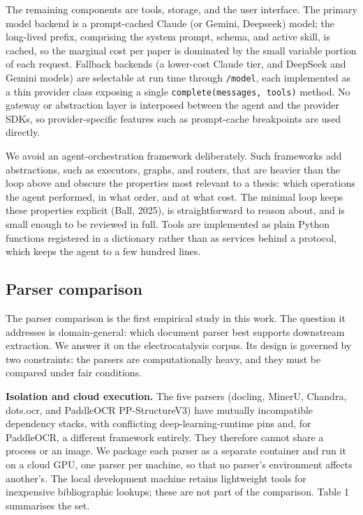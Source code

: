 \documentclass{template}
\begin{document}
The remaining components are tools, storage, and the user interface. The primary model backend is a prompt-cached Claude (or Gemini, Deepseek) model; the long-lived prefix, comprising the system prompt, schema, and active skill, is cached, so the marginal cost per paper is dominated by the small variable portion of each request. Fallback backends (a lower-cost Claude tier, and DeepSeek and Gemini models) are selectable at run time through \texttt{/model}, each implemented as a thin provider class exposing a single \texttt{complete(messages, tools)} method. No gateway or abstraction layer is interposed between the agent and the provider SDKs, so provider-specific features such as prompt-cache breakpoints are used directly.

We avoid an agent-orchestration framework deliberately. Such frameworks add abstractions, such as executors, graphs, and routers, that are heavier than the loop above and obscure the properties most relevant to a thesis: which operations the agent performed, in what order, and at what cost. The minimal loop keeps these properties explicit (Ball, 2025), is straightforward to reason about, and is small enough to be reviewed in full. Tools are implemented as plain Python functions registered in a dictionary rather than as services behind a protocol, which keeps the agent to a few hundred lines.

\subsection{Parser comparison}

The parser comparison is the first empirical study in this work. The question it addresses is domain-general: which document parser best supports downstream extraction. We answer it on the electrocatalysis corpus. Its design is governed by two constraints: the parsers are computationally heavy, and they must be compared under fair conditions.

\textbf{Isolation and cloud execution.} The five parsers (docling, MinerU, Chandra, dots.ocr, and PaddleOCR PP-StructureV3) have mutually incompatible dependency stacks, with conflicting deep-learning-runtime pins and, for PaddleOCR, a different framework entirely. They therefore cannot share a process or an image. We package each parser as a separate container and run it on a cloud GPU, one parser per machine, so that no parser's environment affects another's. The local development machine retains lightweight tools for inexpensive bibliographic lookups; these are not part of the comparison. Table 1 summarises the set.
\end{document}
